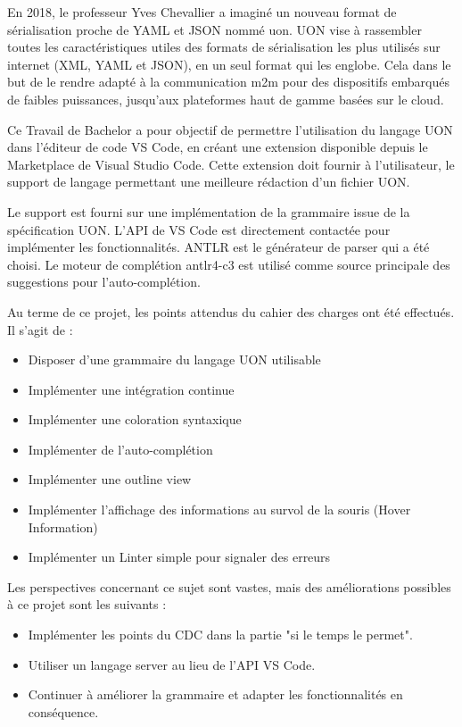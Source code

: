 
En 2018, le professeur Yves Chevallier a imaginé un nouveau format de sérialisation proche de YAML et JSON nommé \Gls{uon}.
UON vise à rassembler toutes les caractéristiques utiles des formats de sérialisation les plus utilisés sur internet (XML, YAML et JSON),
en un seul format qui les englobe. Cela dans le but de le rendre adapté à la communication \Gls{m2m} pour des dispositifs embarqués de faibles puissances, jusqu'aux plateformes haut de gamme basées sur le cloud.

Ce Travail de Bachelor a pour objectif de permettre l'utilisation du langage UON dans l'éditeur de code VS Code, en créant une extension disponible depuis le Marketplace de Visual Studio Code.
Cette extension doit fournir à l'utilisateur, le support de langage permettant une meilleure rédaction d'un fichier UON.

Le support est fourni sur une implémentation de la grammaire issue de la spécification UON.
L'API de VS Code est directement contactée pour implémenter les fonctionnalités.
ANTLR est le générateur de parser qui a été choisi.
Le moteur de complétion antlr4-c3 est utilisé comme source principale des suggestions pour l'auto-complétion.

Au terme de ce projet, les points attendus du cahier des charges ont été effectués. Il s'agit de :
\begin{itemize}
    \item Disposer d'une grammaire du langage UON utilisable
    \item Implémenter une intégration continue
    \item Implémenter une coloration syntaxique
    \item Implémenter de l'auto-complétion
    \item Implémenter une outline view
    \item Implémenter l'affichage des informations au survol de la souris (Hover Information)
    \item Implémenter un Linter simple pour signaler des erreurs
\end{itemize}

Les perspectives concernant ce sujet sont vastes, mais des améliorations possibles à ce projet sont les suivants :
\begin{itemize}
    \item Implémenter les points du CDC dans la partie "si le temps le permet".
    \item Utiliser un langage server au lieu de l'API VS Code.
    \item Continuer à améliorer la grammaire et adapter les fonctionnalités en conséquence.
\end{itemize}